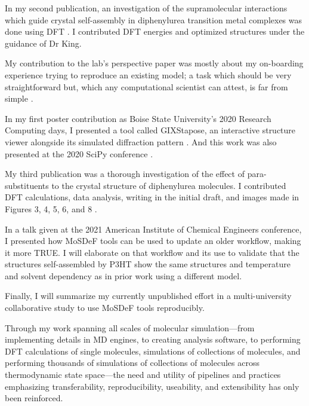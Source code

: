 In my second publication, an investigation of the supramolecular interactions which guide crystal self-assembly in diphenylurea transition metal complexes was done using DFT \cite{Millard2019a}.
I contributed DFT energies and optimized structures under the guidance of Dr King.

My contribution to the lab's perspective paper was mostly about my on-boarding experience trying to reproduce an existing model; a task which should be very straightforward but, which any computational scientist can attest, is far from simple \cite{Jankowski2019}.

In my first poster contribution as Boise State University's 2020 Research Computing days, I presented a tool called GIXStapose, an interactive structure viewer alongside its simulated diffraction pattern \cite{gixstapose}. And this work was also presented at the 2020 SciPy conference \cite{gixstapose, scipy2020}.

My third publication was a thorough investigation of the effect of para-substituents to the crystal structure of diphenylurea molecules. I contributed DFT calculations, data analysis, writing in the initial draft, and images made in Figures 3, 4, 5, 6, and 8 \cite{Fothergill2021}.

In a talk given at the 2021 American Institute of Chemical Engineers conference, I presented how MoSDeF tools can be used to update an older workflow, making it more TRUE. 
I will elaborate on that workflow and its use to validate that the structures self-assembled by P3HT show the same structures and temperature and solvent dependency as in prior work using a different model.

Finally, I will summarize my currently unpublished effort in a multi-university collaborative study to use MoSDeF tools reproducibly.

Through my work spanning all scales of molecular simulation---from implementing details in MD engines, to creating analysis software, to performing DFT calculations of single molecules, simulations of collections of molecules, and performing thousands of  simulations of collections of molecules across thermodynamic state space---the need and utility of  pipelines and practices emphasizing transferability, reproducibility, useability, and extensibility has only been reinforced.

